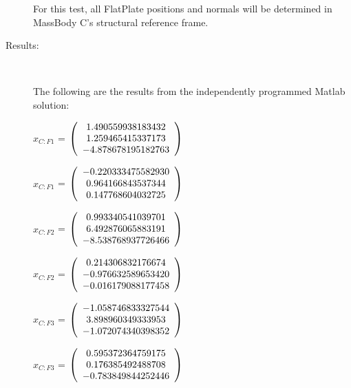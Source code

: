 \begin{description}
For this test, all FlatPlate positions and normals will be determined in
MassBody C's structural reference frame.

\item[Results:] \ \newline

The following are the results from the independently programmed Matlab solution:

$x_{C:F1}$  = $\left( \begin{array} {ccc} 1.490559938183432 \\ 1.259465415337173 \\ -4.878678195182763
\end{array} \right)\\ \\$

$\hat{x}_{C:F1}$  = $\left( \begin{array} {ccc} -0.220333475582930 \\ 0.964166843537344 \\ 0.147768604032725
\end{array} \right)\\ \\$

$x_{C:F2}$  = $\left( \begin{array} {ccc} 0.993340541039701 \\ 6.492876065883191 \\ -8.538768937726466
\end{array} \right)\\ \\$

$\hat{x}_{C:F2}$  = $\left( \begin{array} {ccc} 0.214306832176674 \\ -0.976632589653420 \\ -0.016179088177458
\end{array} \right)\\ \\$

$x_{C:F3}$  = $\left( \begin{array} {ccc} -1.058746833327544 \\ 3.898960349333953 \\ -1.072074340398352
\end{array} \right)\\ \\$

$\hat{x}_{C:F3}$  = $\left( \begin{array} {ccc} 0.595372364759175 \\ 0.176385492488708 \\ -0.783849844252446
\end{array} \right)\\ \\$


\end{description}
